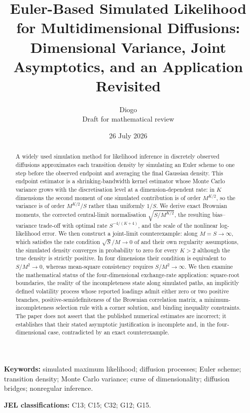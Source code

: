 \documentclass[11pt]{article}
\title{\textbf{Euler-Based Simulated Likelihood for Multidimensional Diffusions:}\\
Dimensional Variance, Joint Asymptotics, and an Application Revisited}
\author{Diogo\\[0.3em]\small Draft for mathematical review}
\date{26 July 2026}
\theoremstyle{definition}
\begin{document}
\maketitle

\begin{abstract}
A widely used simulation method for likelihood inference in discretely observed diffusions approximates each transition density by simulating an Euler scheme to one step before the observed endpoint and averaging the final Gaussian density. This endpoint estimator is a shrinking-bandwidth kernel estimator whose Monte Carlo variance grows with the discretisation level at a dimension-dependent rate: in $K$ dimensions the second moment of one simulated contribution is of order $M^{K/2}$, so the variance is of order $M^{K/2}/S$ rather than uniformly $1/S$. We derive exact Brownian moments, the corrected central-limit normalisation $\sqrt{S/M^{K/2}}$, the resulting bias--variance trade-off with optimal rate $S^{-4/(K+4)}$, and the scale of the nonlinear log-likelihood error. We then construct a joint-limit counterexample: along $M=S\to\infty$, which satisfies the rate condition $\sqrt S/M\to0$ of \citet{BrandtSantaClara2002} and their own regularity assumptions, the simulated density converges in probability to zero for every $K>2$ although the true density is strictly positive. In four dimensions their condition is equivalent to $S/M^2\to0$, whereas mean-square consistency requires $S/M^2\to\infty$. We then examine the mathematical status of the four-dimensional exchange-rate application: square-root boundaries, the reality of the incompleteness state along simulated paths, an implicitly defined volatility process whose reported loadings admit either zero or two positive branches, positive-semidefiniteness of the Brownian correlation matrix, a minimum-incompleteness selection rule with a corner solution, and binding inequality constraints. The paper does not assert that the published numerical estimates are incorrect; it establishes that their stated asymptotic justification is incomplete and, in the four-dimensional case, contradicted by an exact counterexample.
\end{abstract}

\noindent\textbf{Keywords:} simulated maximum likelihood; diffusion processes; Euler scheme; transition density; Monte Carlo variance; curse of dimensionality; diffusion bridges; nonregular inference.

\noindent\textbf{JEL classifications:} C13; C15; C32; G12; G15.
\end{document}
